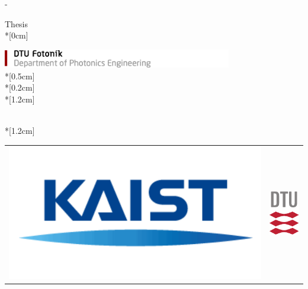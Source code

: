 \thispagestyle{empty}             %
\calccentering{\unitlength}
\begin{adjustwidth*}{\unitlength}{-\unitlength}
    \begin{adjustwidth}{-0.5cm}{-0.5cm}
        \sffamily
        \begin{flushright}
            \thesistypeabbr{} Thesis\\*[0cm]
            \thesistype{}\\        \end{flushright}
        \vspace*{\fill}
        \noindent
        \includegraphics[width=0.75\textwidth]{Graphic/Titlepage/DTU Fotonik}\\*[0.5cm]
        \HUGE \thesistitle{}\\*[0.2cm]
        \Large \thesissubtitle{}\\*[1.2cm]
        \parbox[b]{0.7\linewidth}{%
            \Large
            \thesisauthor{}\\*[1.2cm]
            \Large
            \thesislocation{} \the\year
        }
        \hfill\begin{tabular}{cc}
            \includegraphics[scale=0.7]{Graphic/Titlepage/KAIST Logo} \hspace{0.1cm} & \includegraphics[scale=1.2]{Graphic/Titlepage/DTU Logo}
        \end{tabular}
    \end{adjustwidth}
\end{adjustwidth*}
\normalfont
\normalsize
